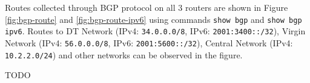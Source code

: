 Routes collected through BGP protocol on all $3$ routers are shown in Figure \ref{fig:bgp-route} and \ref{fig:bgp-route-ipv6} using commands \texttt{show bgp} and \texttt{show bgp ipv6}. 
Routes to DT Network (IPv4: \texttt{34.0.0.0/8}, IPv6: \texttt{2001:3400::/32}), Virgin Network (IPv4: \texttt{56.0.0.0/8}, IPv6: \texttt{2001:5600::/32}), Central Network (IPv4: \texttt{10.2.2.0/24}) and other networks can be observed in the figure.

TODO





